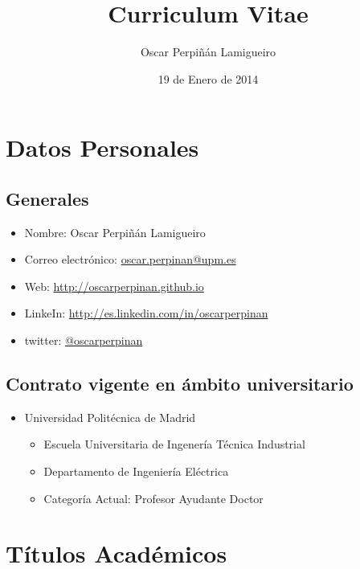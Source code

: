 \documentclass[article, a4paper]{memoir}
\author{Oscar Perpiñán Lamigueiro}
\date{19 de Enero de 2014}
\title{Curriculum Vitae}
\begin{document}
\maketitle


\section{Datos Personales}
\label{sec-1}

\subsection{Generales}
\label{sec-1-1}

\begin{itemize}
\item Nombre: Oscar Perpiñán Lamigueiro
\item Correo electrónico: \href{mailto:oscar.perpinan@upm.es}{oscar.perpinan@upm.es}
\item Web: \url{http://oscarperpinan.github.io}
\item LinkeIn: \url{http://es.linkedin.com/in/oscarperpinan}
\item twitter: \href{https://twitter.com/oscarperpinan}{@oscarperpinan}
\end{itemize}


\subsection{Contrato vigente en ámbito universitario}
\label{sec-1-2}

\begin{itemize}
\item Universidad Politécnica de Madrid
\begin{itemize}
\item Escuela Universitaria de Ingenería Técnica Industrial
\item Departamento de Ingeniería Eléctrica
\item Categoría Actual: Profesor Ayudante Doctor
\end{itemize}
\end{itemize}


\section{Títulos Académicos}
\label{sec-2}
\end{document}
